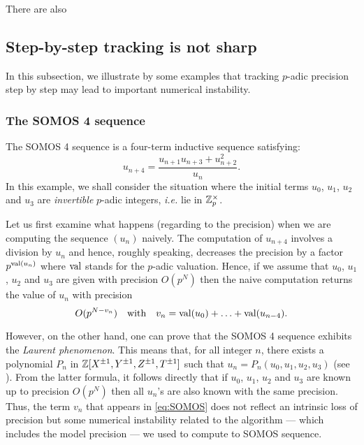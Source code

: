 \documentclass{lms}
\begin{document}
There are also 


\subsection{Step-by-step tracking is not sharp}


In this subsection, we illustrate by some examples that tracking
$p$-adic precision step by step may lead to important numerical
instability.

\subsubsection*{The SOMOS 4 sequence}

The SOMOS 4 sequence is a four-term inductive sequence satisfying:
$$u_{n+4} = \frac{u_{n+1} u_{n+3} + u_{n+2}^2}{u_n}.$$
In this example, we shall consider the situation where the initial
terms $u_0$, $u_1$, $u_2$ and $u_3$ are \emph{invertible} $p$-adic 
integers, \emph{i.e.} lie in $\mathbb Z_p^\times$.

Let us first examine what happens (regarding to the precision) when
we are computing the sequence $(u_n)$ naively. The computation of
$u_{n+4}$ involves a division by $u_n$ and hence, roughly speaking,
decreases the precision by a factor $p^{\text{\rm val}(u_n)}$ where $\text{\rm val}$
stands for the $p$-adic valuation. Hence, if we assume that $u_0$,
$u_1$, $u_2$ and $u_3$ are given with precision $O(p^N)$ then the
naive computation returns the value of $u_n$ with precision
\begin{equation}
\label{eq:SOMOS}
O(p^{N-v_n})
\quad \text{with}\quad
v_n = \text{\rm val}(u_0) + \ldots + \text{\rm val}(u_{n-4}).
\end{equation}

However, on the other hand, one can prove that the SOMOS 4 sequence 
exhibits the \emph{Laurent phenomenon}. This means that, for all integer 
$n$, there exists a polynomial $P_n$ in $\mathbb Z[X^{\pm 1}, Y^{\pm 1}, Z^{\pm 
1}, T^{\pm 1}]$ such that $u_n = P_n(u_0, u_1, u_2, u_3)$ (see \cite{fomin-zelevinsky:02a}).
From the latter formula, it follows directly that if $u_0$, $u_1$,
$u_2$ and $u_3$ are known up to precision $O(p^N)$ then all $u_n$'s
are also known with the same precision. Thus, the term $v_n$ that 
appears in \eqref{eq:SOMOS} does not reflect an intrinsic loss of
precision but some numerical instability related to the algorithm ---
which includes the model precision --- we used to compute to SOMOS 
sequence.
\end{document}
